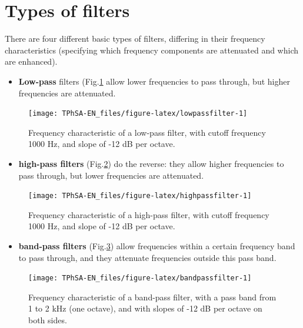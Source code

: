 \documentclass[
]{book}
\providecommand{\tightlist}{%
  \setlength{\itemsep}{0pt}\setlength{\parskip}{0pt}}
\begin{document}
\section{Types of filters}\label{sec:typesoffilters}

There are four different basic types of filters, differing in their frequency characteristics (specifying which frequency components are attenuated and which are enhanced).

\begin{itemize}
\tightlist
\item
  \textbf{Low-pass} filters (Fig.\ref{fig:lowpassfilter} allow lower frequencies to pass through, but higher frequencies are attenuated.
\end{itemize}

\begin{figure}

{\centering \texttt{[image: TPhSA-EN\_files/figure-latex/lowpassfilter-1]} 

}

\caption{Frequency characteristic of a low-pass filter, with cutoff frequency 1000 Hz, and slope of -12 dB per octave.}\label{fig:lowpassfilter}
\end{figure}

\begin{itemize}
\tightlist
\item
  \textbf{high-pass filters} (Fig.\ref{fig:highpassfilter}) do the reverse: they allow higher frequencies to pass through, but lower frequencies are attenuated.
\end{itemize}

\begin{figure}

{\centering \texttt{[image: TPhSA-EN\_files/figure-latex/highpassfilter-1]} 

}

\caption{Frequency characteristic of a high-pass filter, with cutoff frequency 1000 Hz, and slope of -12 dB per octave.}\label{fig:highpassfilter}
\end{figure}

\begin{itemize}
\tightlist
\item
  \textbf{band-pass filters} (Fig.\ref{fig:bandpassfilter}) allow frequencies within a certain frequency band to pass through, and they attenuate frequencies outside this pass band.
\end{itemize}

\begin{figure}

{\centering \texttt{[image: TPhSA-EN\_files/figure-latex/bandpassfilter-1]} 

}

\caption{Frequency characteristic of a band-pass filter, with a pass band from 1 to 2 kHz (one octave), and with slopes of -12 dB per octave on both sides.}\label{fig:bandpassfilter}
\end{figure}
\end{document}

